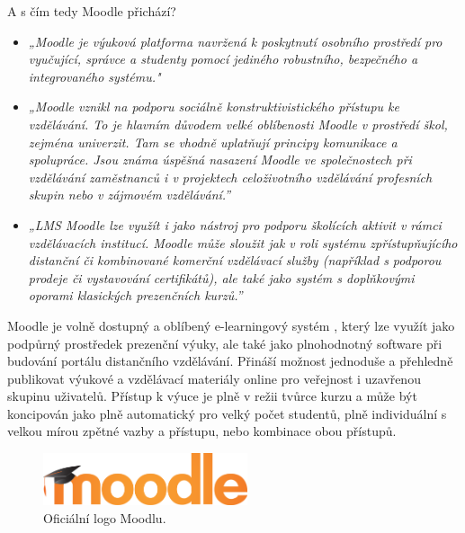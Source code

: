 \documentclass[
print,
  11pt,
  table,   
  nolof,    
  nolot,
  oneside,
  draft
]{fithesis3}
\begin{document}
A s čím tedy Moodle přichází?
\begin{itemize}
\item \emph{„Moodle je výuková platforma navržená k poskytnutí osobního prostředí pro vyučující, správce a studenty pomocí jediného robustního, bezpečného a integrovaného systému."}\cite{moodle-about}		
\item \emph{„Moodle vznikl na podporu sociálně konstruktivistického přístupu ke vzdělávání. To je hlavním důvodem velké oblíbenosti Moodle v prostředí škol, zejména univerzit. Tam se vhodně uplatňují principy komunikace a spolupráce. Jsou známa úspěšná nasazení Moodle ve společnostech při vzdělávání zaměstnanců i v projektech celoživotního vzdělávání profesních skupin nebo v zájmovém vzdělávání.”} \cite{pdcmoodle}
\item \emph{„LMS Moodle lze využít i jako nástroj pro podporu školících aktivit v rámci vzdělávacích institucí. Moodle může sloužit jak v roli systému zpřístupňujícího distanční či kombinované komerční vzdělávací služby (například s podporou prodeje či vystavování certifikátů), ale také jako systém s doplňkovými oporami klasických prezenčních kurzů.” }\cite{pdcmoodleinst}
\end{itemize}

Moodle je volně dostupný a oblíbený e-learningový systém \cite{capterra}, který lze využít jako podpůrný prostředek prezenční výuky, ale také jako plnohodnotný software při budování portálu distančního vzdělávání. Přináší možnost jednoduše a přehledně publikovat výukové a vzdělávací materiály online pro veřejnost i uzavřenou skupinu uživatelů.  Přístup k výuce je plně v režii tvůrce kurzu a může být koncipován jako plně automatický pro velký počet studentů, plně individuální s velkou mírou zpětné vazby a přístupu, nebo kombinace obou přístupů.
\begin{figure}
		  \begin{center}
		    \includegraphics[width=60mm]{images/moodle-logo.png}
		   \end{center}
		  \caption{Oficiální logo Moodlu. \cite{moodle-logo}}
		  \label{fig:moodlelogo}
		\end{figure}
\end{document}
